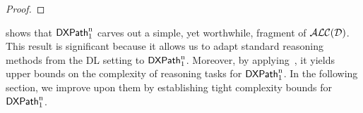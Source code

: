 \begin{proof}
\end{proof}

 shows that $\mathsf{DXPath}_{\rm 1}^{\rm n}$ carves out a simple, yet worthwhile, fragment of $\mathcal{ALC(D)}$. This result is significant because it allows us to adapt standard reasoning methods from the DL setting to $\mathsf{DXPath}_{\rm 1}^{\rm n}$. Moreover, by applying~, it yields upper bounds on the complexity of reasoning tasks for $\mathsf{DXPath}_{\rm 1}^{\rm n}$. In the following section, we improve upon them by establishing tight complexity bounds for $\mathsf{DXPath}_{\rm 1}^{\rm n}$.